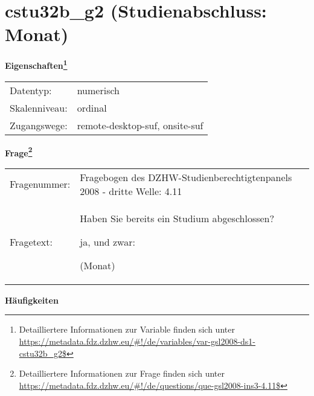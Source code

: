 
    \setcounter{footnote}{0}

    \vspace*{-1.8cm}
	\section{cstu32b\_g2 (Studienabschluss: Monat)}
	\label{section:cstu32b_g2}



    \vspace*{0.5cm}
    \noindent\textbf{Eigenschaften\footnote{Detailliertere Informationen zur Variable finden sich unter
		\url{https://metadata.fdz.dzhw.eu/\#!/de/variables/var-gsl2008-ds1-cstu32b_g2$}}}\\
	\begin{tabularx}{\hsize}{@{}lX}
	Datentyp: & numerisch \\
	Skalenniveau: & ordinal \\
	Zugangswege: &
	  remote-desktop-suf, 
	  onsite-suf
 \\
    \end{tabularx}



				\vspace*{0.5cm}
                \noindent\textbf{Frage\footnote{Detailliertere Informationen zur Frage finden sich unter
		              \url{https://metadata.fdz.dzhw.eu/\#!/de/questions/que-gsl2008-ins3-4.11$}}}\\
				\begin{tabularx}{\hsize}{@{}lX}
					Fragenummer: &
					  Fragebogen des DZHW-Studienberechtigtenpanels 2008 - dritte Welle:
					  4.11
 \\
					Fragetext: & Haben Sie bereits ein Studium abgeschlossen?\par  ja, und zwar:\par  (Monat) \\
				\end{tabularx}





        		\vspace*{0.5cm}
                \noindent\textbf{Häufigkeiten}

